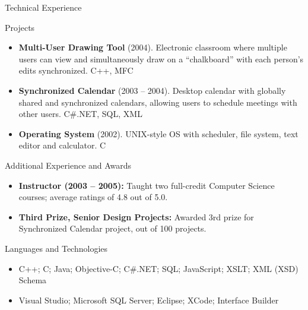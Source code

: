 \documentclass[]{mcdowellcv}
\begin{document}
	\begin{cvsection}{Technical Experience}
		\begin{cvsubsection}{Projects}{}{}
			\begin{itemize}
				\item \textbf{Multi-User Drawing Tool} (2004). Electronic classroom where multiple users can view and simultaneously draw on a “chalkboard” with each person’s edits synchronized.  C++, MFC
				\item \textbf{Synchronized Calendar} (2003 – 2004). Desktop calendar with globally shared and synchronized calendars, allowing users to schedule meetings with other users.  C\#.NET, SQL, XML
				\item \textbf{Operating System} (2002).  UNIX-style OS with scheduler, file system, text editor and calculator. C
			\end{itemize}
		\end{cvsubsection}
	\end{cvsection}
	
	\begin{cvsection}{Additional Experience and Awards}
		\begin{cvsubsection}{}{}{}	
			\begin{itemize}
				\item \textbf{Instructor (2003 – 2005):} Taught two full-credit Computer Science courses; average ratings of 4.8 out of 5.0.
				\item \textbf{Third Prize, Senior Design Projects:} Awarded 3rd prize for Synchronized Calendar project, out of 100 projects.
			\end{itemize}
		\end{cvsubsection}
	\end{cvsection}
	
	\begin{cvsection}{Languages and Technologies}
		\begin{cvsubsection}{}{}{}	
			\begin{itemize}
				\item C++; C; Java; Objective-C; C\#.NET; SQL; JavaScript; XSLT; XML (XSD) Schema 
				\item Visual Studio; Microsoft SQL Server; Eclipse; XCode; Interface Builder
			\end{itemize}
		\end{cvsubsection}
	\end{cvsection}
	
\end{document}

